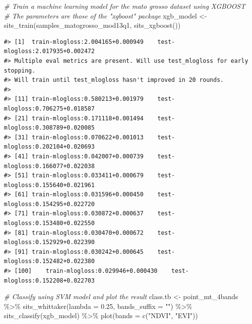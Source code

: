 \documentclass[a4paper,]{tufte-book}
\newenvironment{Shaded}{}{}
\newcommand{\AttributeTok}[1]{\textcolor[rgb]{0.49,0.56,0.16}{#1}}
\newcommand{\CommentTok}[1]{\textcolor[rgb]{0.38,0.63,0.69}{\textit{#1}}}
\newcommand{\FloatTok}[1]{\textcolor[rgb]{0.25,0.63,0.44}{#1}}
\newcommand{\FunctionTok}[1]{\textcolor[rgb]{0.02,0.16,0.49}{#1}}
\newcommand{\NormalTok}[1]{#1}
\newcommand{\OtherTok}[1]{\textcolor[rgb]{0.00,0.44,0.13}{#1}}
\newcommand{\SpecialCharTok}[1]{\textcolor[rgb]{0.25,0.44,0.63}{#1}}
\newcommand{\StringTok}[1]{\textcolor[rgb]{0.25,0.44,0.63}{#1}}
\begin{document}
\begin{Shaded}
\begin{Highlighting}[]
\CommentTok{\# Train a machine learning model for the mato grosso dataset using XGBOOST}
\CommentTok{\# The parameters are those of the "xgboost" package}
\NormalTok{xgb\_model }\OtherTok{\textless{}{-}} \FunctionTok{sits\_train}\NormalTok{(samples\_matogrosso\_mod13q1, }\FunctionTok{sits\_xgboost}\NormalTok{())}
\end{Highlighting}
\end{Shaded}

\begin{verbatim}
#> [1]  train-mlogloss:2.004165+0.000949    test-mlogloss:2.017935+0.002472 
#> Multiple eval metrics are present. Will use test_mlogloss for early stopping.
#> Will train until test_mlogloss hasn't improved in 20 rounds.
#> 
#> [11] train-mlogloss:0.580213+0.001979    test-mlogloss:0.706275+0.018587 
#> [21] train-mlogloss:0.171118+0.001494    test-mlogloss:0.308789+0.020085 
#> [31] train-mlogloss:0.070622+0.001013    test-mlogloss:0.202104+0.020693 
#> [41] train-mlogloss:0.042007+0.000739    test-mlogloss:0.166077+0.022038 
#> [51] train-mlogloss:0.033411+0.000679    test-mlogloss:0.155640+0.021961 
#> [61] train-mlogloss:0.031596+0.000450    test-mlogloss:0.154295+0.022720 
#> [71] train-mlogloss:0.030872+0.000637    test-mlogloss:0.153480+0.022550 
#> [81] train-mlogloss:0.030470+0.000672    test-mlogloss:0.152929+0.022390 
#> [91] train-mlogloss:0.030242+0.000645    test-mlogloss:0.152482+0.022380 
#> [100]    train-mlogloss:0.029946+0.000430    test-mlogloss:0.152208+0.022703
\end{verbatim}

\begin{Shaded}
\begin{Highlighting}[]
\CommentTok{\# Classify using SVM model and plot the result}
\NormalTok{class.tb }\OtherTok{\textless{}{-}}\NormalTok{ point\_mt\_4bands }\SpecialCharTok{\%\textgreater{}\%} 
    \FunctionTok{sits\_whittaker}\NormalTok{(}\AttributeTok{lambda =} \FloatTok{0.25}\NormalTok{, }\AttributeTok{bands\_suffix =} \StringTok{""}\NormalTok{) }\SpecialCharTok{\%\textgreater{}\%} 
    \FunctionTok{sits\_classify}\NormalTok{(xgb\_model) }\SpecialCharTok{\%\textgreater{}\%} 
    \FunctionTok{plot}\NormalTok{(}\AttributeTok{bands =} \FunctionTok{c}\NormalTok{(}\StringTok{"NDVI"}\NormalTok{, }\StringTok{"EVI"}\NormalTok{))}
\end{Highlighting}
\end{Shaded}
\end{document}
